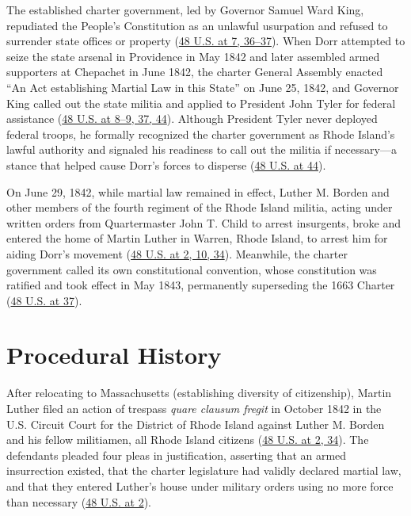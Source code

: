 \documentclass[12pt]{article}
\begin{document}
The established charter government, led by Governor Samuel Ward King, repudiated the People's Constitution as an unlawful usurpation and refused to surrender state offices or property (\href{https://supreme.justia.com/cases/federal/us/48/1/}{48 U.S. at 7, 36--37}). When Dorr attempted to seize the state arsenal in Providence in May 1842 and later assembled armed supporters at Chepachet in June 1842, the charter General Assembly enacted ``An Act establishing Martial Law in this State'' on June 25, 1842, and Governor King called out the state militia and applied to President John Tyler for federal assistance (\href{https://supreme.justia.com/cases/federal/us/48/1/}{48 U.S. at 8--9, 37, 44}). Although President Tyler never deployed federal troops, he formally recognized the charter government as Rhode Island's lawful authority and signaled his readiness to call out the militia if necessary---a stance that helped cause Dorr's forces to disperse (\href{https://supreme.justia.com/cases/federal/us/48/1/}{48 U.S. at 44}).

On June 29, 1842, while martial law remained in effect, Luther M. Borden and other members of the fourth regiment of the Rhode Island militia, acting under written orders from Quartermaster John T. Child to arrest insurgents, broke and entered the home of Martin Luther in Warren, Rhode Island, to arrest him for aiding Dorr's movement (\href{https://supreme.justia.com/cases/federal/us/48/1/}{48 U.S. at 2, 10, 34}). Meanwhile, the charter government called its own constitutional convention, whose constitution was ratified and took effect in May 1843, permanently superseding the 1663 Charter (\href{https://supreme.justia.com/cases/federal/us/48/1/}{48 U.S. at 37}).

\section{Procedural History}

After relocating to Massachusetts (establishing diversity of citizenship), Martin Luther filed an action of trespass \textit{quare clausum fregit} in October 1842 in the U.S. Circuit Court for the District of Rhode Island against Luther M. Borden and his fellow militiamen, all Rhode Island citizens (\href{https://supreme.justia.com/cases/federal/us/48/1/}{48 U.S. at 2, 34}). The defendants pleaded four pleas in justification, asserting that an armed insurrection existed, that the charter legislature had validly declared martial law, and that they entered Luther's house under military orders using no more force than necessary (\href{https://supreme.justia.com/cases/federal/us/48/1/}{48 U.S. at 2}).
\end{document}

